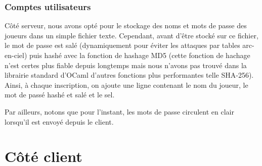 \documentclass[a4paper, 11pt]{article}
\begin{document}
\subsubsection {Comptes utilisateurs}

Côté serveur, nous avons opté pour le stockage des noms et mots de
passe des joueurs dans un simple fichier texte. Cependant, avant
d'être stocké sur ce fichier, le mot de passe est salé (dynamiquement
pour éviter les attaques par tables arc-en-ciel) puis hashé avec la
fonction de hashage MD5 (cette fonction de hachage n'est certes plus
fiable depuis longtemps mais nous n’avons pas trouvé dans la librairie
standard d'OCaml d’autres fonctions plus performantes telle SHA-256).
Ainsi, à chaque inscription, on ajoute une ligne contenant le nom du
joueur, le mot de passé hashé et salé et le sel.

\bigskip Par ailleurs, notons que pour l’instant, les mots de passe
circulent en clair lorsqu’il est envoyé depuis le client.

\section{Côté client}
\end{document}
